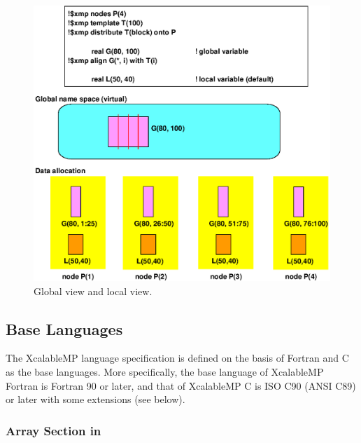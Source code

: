 \begin{figure}
  \centering
  \includegraphics[width=12cm]{figs/Fig4.eps}
  \caption{Global view and local view.}
  \label{fig4}
\end{figure}


\subsection{Base Languages}

The XcalableMP language specification is defined on the basis of Fortran
and C as the base languages. More specifically, the base language of
XcalableMP Fortran is Fortran 90 or later, and that of XcalableMP C is
ISO C90 (ANSI C89) or later with some extensions (see below).

\subsubsection{Array Section in {\XMPC}}






